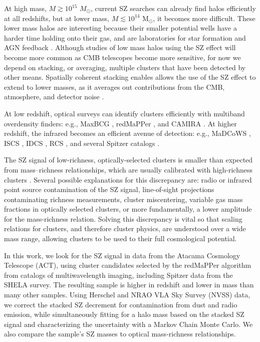 \documentclass[a4paper,fleqn,usenatbib]{mnras}
\begin{document}
At high mass, $M \gtrsim 10^{15}$ $M_\odot$, current SZ searches can already find halos efficiently at all redshifts, but at lower mass, $M \lesssim 10^{14}$ M$_{\odot}$, it becomes more difficult. 
These lower mass halos are interesting because their smaller potential wells have a harder time holding onto their gas, and are laboratories for star formation and AGN feedback \citep{2011ApJ...736...39H, 2013ApJ...767...38S, 2013A&A...555A..66L, 2015MNRAS.448.2085L}.  
Although studies of low mass halos using the SZ effect will become more common as CMB telescopes become more sensitive, for now we depend on stacking, or averaging, multiple clusters that have been detected by other means.  
Spatially coherent stacking enables allows the use of the SZ effect to extend to lower masses, as it averages out contributions from the CMB, atmosphere, and detector noise \citep{2013ApJ...767...38S, 2011A&A...536A..12P, 2011ApJ...736...39H}.

At low redshift, optical surveys can identify clusters efficiently with multiband overdensity finders: e.g., MaxBCG \citep{2007ApJ...660..221K}, redMaPPer \citep{2014ApJ...785..104R}, and CAMIRA \citep{2014MNRAS.444..147O}.
At higher redshift, the infrared becomes an efficient avenue of detection: e.g., MaDCoWS \citep{2014ApJS..213...25S,2018arXiv180906820G}, ISCS 
\citep{2008ApJ...684..905E}, IDCS \citep{2012ApJ...753..164S}, RCS \citep{2000AJ....120.2148G}, and several Spitzer catalogs \citep{2008ApJ...676..206P, 2010ApJ...716.1503P}.

The SZ signal of low-richness, optically-selected clusters is smaller than expected from mass--richness relationships, which are usually calibrated with high-richness clusters \citep{2011A&A...536A..12P,2012PhRvD..85b3005D,2013ApJ...767...38S,2016arXiv160508770S}. 
Several possible explanations for this discrepancy are: radio or infrared point source contamination of the SZ signal, line-of-sight projections contaminating richness measurements, cluster miscentering, variable gas mass fractions in optically selected clusters, or more fundamentally, a lower amplitude for the mass-richness relation.
Solving this discrepancy is vital so that scaling relations for clusters, and therefore cluster physics, are understood over a wide mass range, allowing clusters to be used to their full cosmological potential.

In this work, we look for the SZ signal in data from the Atacama Cosmology Telescope (ACT), using cluster candidates selected by the redMaPPer algorithm from catalogs of multiwavelength imaging, including Spitzer data from the SHELA survey.
The resulting sample is higher in redshift and lower in mass than many other samples. 
Using Herschel and NRAO VLA Sky Survey (NVSS) data, we correct the stacked SZ decrement for contamination from dust and radio emission, while simultaneously fitting for a halo mass based on the stacked SZ signal and characterizing the uncertainty with a Markov Chain Monte Carlo.
We also compare the sample's SZ masses to optical mass-richness relationships.
\end{document}
